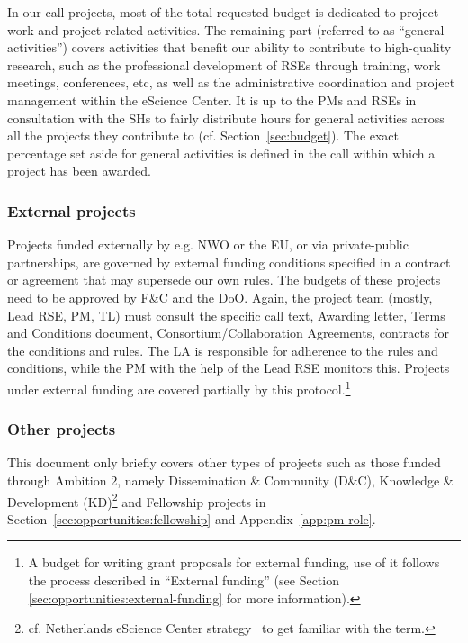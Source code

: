 \documentclass[11pt]{article}
\begin{document}
In our call projects, most of the total requested budget is dedicated to project work and project-related activities.
The remaining part (referred to as “general activities”) covers activities that benefit our ability to contribute to
high-quality research, such as the professional development of RSEs through training, work meetings, conferences, etc,
as well as the administrative coordination and project management within the eScience Center. It is up to the PMs and
RSEs in consultation with the SHs to fairly distribute hours for general activities across all the projects they
contribute to (cf. Section~\ref{sec:budget}). The exact percentage set aside for general activities is defined in
the call within which a project has been awarded.

\subsubsection{External projects}

Projects funded externally by e.g. NWO or the EU, or via private-public partnerships, are governed by external funding
conditions specified in a contract or agreement that may supersede our own rules. The budgets of these projects need to
be approved by F\&C and the DoO. Again, the project team (mostly, Lead RSE, PM, TL) must consult the specific call
text, Awarding letter, Terms and Conditions document, Consortium/Collaboration Agreements, contracts for the conditions
and rules. The LA is responsible for adherence to the rules and conditions, while the PM with the help of the Lead RSE
monitors this. Projects under external funding are covered partially by this protocol.\footnote{A budget for writing
grant proposals for external funding, use of it follows the process described in “External funding” (see Section
\ref{sec:opportunities:external-funding} for more information).}

\subsubsection{Other projects}

This document only briefly covers other types of projects such as those funded through Ambition 2, namely Dissemination
\& Community (D\&C), Knowledge \& Development (KD)\footnote{cf. Netherlands eScience Center strategy~\cite{nlesc-strategy} to get familiar with the term.} and Fellowship projects in 
Section~\ref{sec:opportunities:fellowship} and Appendix~\ref{app:pm-role}.
\end{document}

